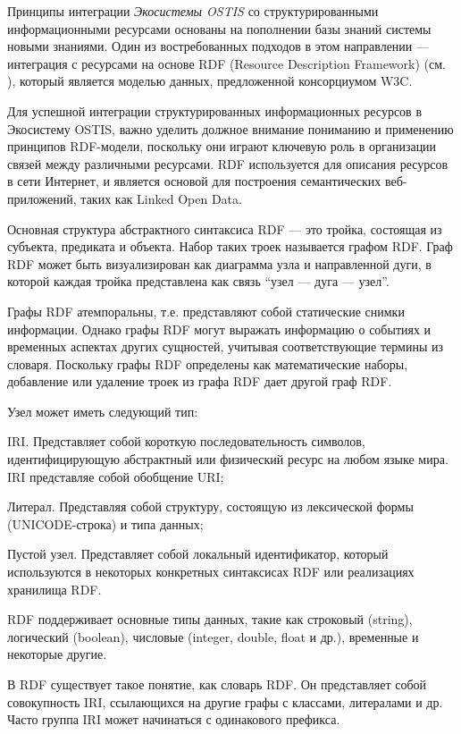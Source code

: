 Принципы интеграции \textit{Экосистемы OSTIS} со структурированными информационными ресурсами основаны на пополнении базы знаний системы новыми знаниями. Один из востребованных подходов в этом направлении --- интеграция с ресурсами на основе RDF (Resource Description Framework) (см. ), который является моделью данных, предложенной консорциумом W3C.

Для успешной интеграции структурированных информационных ресурсов в Экосистему OSTIS, важно уделить должное внимание пониманию и применению принципов RDF-модели, поскольку они играют ключевую роль в организации связей между различными ресурсами. RDF используется для описания ресурсов в сети Интернет, и является основой для построения семантических веб-приложений, таких как Linked Open Data.

Основная структура абстрактного синтаксиса RDF --- это тройка, состоящая из субъекта, предиката и объекта. Набор таких троек называется графом RDF. Граф RDF может быть визуализирован как диаграмма узла и направленной дуги, в которой каждая тройка представлена как связь ``узел --- дуга --- узел''.

Графы RDF атемпоральны, т.е. представляют собой статические снимки информации. Однако графы RDF могут выражать информацию о событиях и временных аспектах других сущностей, учитывая соответствующие термины из словаря. Поскольку графы RDF определены как математические наборы, добавление или удаление троек из графа RDF дает другой граф RDF.

Узел может иметь следующий тип:
\begin{textitemize}
    \item IRI. Представляет собой короткую последовательность символов, идентифицирующую абстрактный или физический ресурс на любом языке мира. IRI представляе собой обобщение URI;
    \item Литерал. Представляя собой структуру, состоящую из лексической формы (UNICODE-строка) и типа данных;
    \item Пустой узел. Представляет собой локальный идентификатор, который используются в некоторых конкретных синтаксисах RDF или реализациях хранилища RDF.
\end{textitemize}

RDF поддерживает основные типы данных, такие как строковый (string), логический (boolean), числовые (integer, double, float и др.), временные и некоторые другие.

В RDF существует такое понятие, как словарь RDF. Он представляет собой совокупность IRI, ссылающихся на другие графы с классами, литералами и др. Часто группа IRI может начинаться с одинакового префикса.


